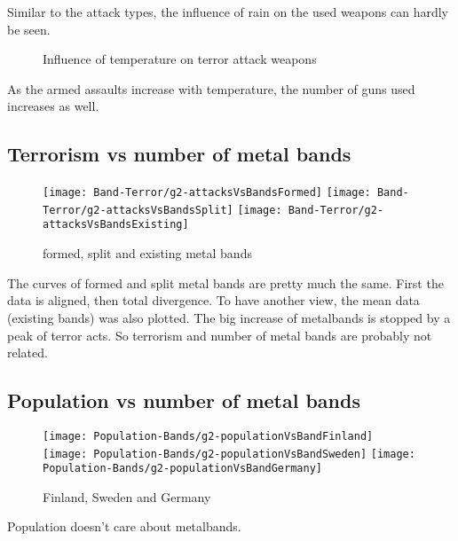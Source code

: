Similar to the attack types, the influence of rain  on the used weapons can hardly be seen.


\newpage

\begin{figure}[!ht]
\centering
    \qquad
    \qquad
    \qquad
    \qquad
    \qquad
\caption{Influence of temperature on terror attack weapons}
\label{fig:example subfigure}
\end{figure}

As the armed assaults increase with temperature, the number of guns used increases as well.






\subsection{Terrorism vs number of metal bands}
\begin{figure}[hbt!]
	\texttt{[image: Band-Terror/g2-attacksVsBandsFormed]}
	\centering
	\texttt{[image: Band-Terror/g2-attacksVsBandsSplit]}
	\texttt{[image: Band-Terror/g2-attacksVsBandsExisting]}
	\caption{formed, split and existing metal bands}
\end{figure}
The curves of formed and split metal bands are pretty much the same. First the data is aligned, then total divergence. To have another view, the mean data (existing bands) was also plotted. The big increase of metalbands is stopped by a peak of terror acts. So terrorism and number of metal bands are probably not related.


\subsection{Population vs number of metal bands}
\begin{figure}[hbt!]
	\texttt{[image: Population-Bands/g2-populationVsBandFinland]}
	\centering
	\texttt{[image: Population-Bands/g2-populationVsBandSweden]}
	\texttt{[image: Population-Bands/g2-populationVsBandGermany]}
	\caption{Finland, Sweden and Germany}
\end{figure}
Population doesn't care about metalbands.

